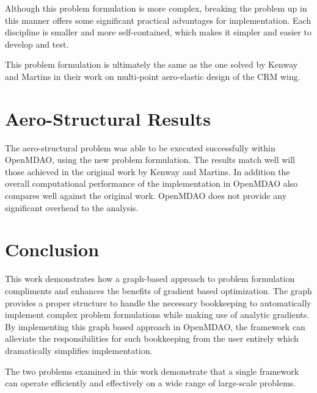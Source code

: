 \documentclass[]{aiaa-tc} %
\begin{document}
  Although this problem formulation is more complex, breaking the problem up in this manner offers some significant 
  practical advantages for implementation. Each discipline is smaller and more self-contained, which makes it simpler 
  and easier to develop and test. 

  This problem formulation is ultimately the same as the one solved by Kenway and Martins\cite{Kenway2012c} in their work on 
  multi-point aero-elastic design of the CRM wing. 

  \section{Aero-Structural Results}

  The aero-structural problem was able to be executed successfully within OpenMDAO, using the new problem formulation. The results 
  match well will those achieved in the original work by Kenway and Martins. In addition the overall computational performance of the 
  implementation in OpenMDAO also compares well against the original work. OpenMDAO does not provide any significant overhead 
  to the analysis. 

  \section{Conclusion}

  This work demonstrates how a graph-based approach to problem formulation compliments and enhances the benefits of gradient based
  optimization. The graph provides a proper structure to handle the necessary bookkeeping to automatically implement complex 
  problem formulations while making use of analytic gradients. By implementing this graph based approach in OpenMDAO, the framework 
  can alleviate the responsibilities for such bookkeeping from the user entirely which dramatically simplifies implementation. 

  The two problems examined in this work demonstrate that a single framework can operate efficiently and effectively on a wide range 
  of large-scale problems. 

  
\end{document}

